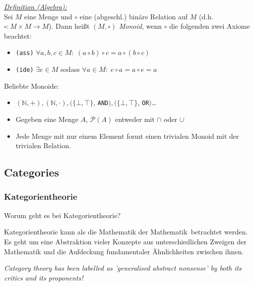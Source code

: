 \documentclass{beamer}
\begin{document}
\begin{frame}
\underline{\emph{Definition (Algebra):}}\\ Sei $M$ eine Menge und $\circ$ eine (abgeschl.) binäre Relation auf $M$ (d.h. $\circ : M \times M \to M$). Dann heißt $(M, \circ)$ \emph{Monoid}, wenn $\circ$ die folgenden zwei Axiome beachtet:

\begin{itemize}
\pause \item \texttt{(ass)} $\forall a,b,c \in M:\; (a \circ b) \circ c = a \circ (b \circ c)$
\pause \item \texttt{(ide)} $\exists e \in M$ sodass $\forall a \in M:\; e \circ a = a \circ e = a$
\end{itemize}
\pause\bigskip

Beliebte Monoide:
\begin{itemize}
\pause \item $(\mathbb{N}, +), (\mathbb{N}, \cdot), (\{\bot, \top\}$, \texttt{AND}$), (\{\bot, \top\}$, \texttt{OR}$)$\dots
\pause \item Gegeben eine Menge $A$, $\mathcal{P}(A)$ entweder mit $\cap$ oder $\cup$
\pause \item Jede Menge mit nur einem Element formt einen trivialen Monoid mit der trivialen Relation.
\end{itemize}

\end{frame}

\subsection*{Categories}

\begin{frame}
\frametitle{Kategorientheorie}

Worum geht es bei Kategorientheorie?
\pause\bigskip

Kategorientheorie kann als die \glqq Mathematik der Mathematik\grqq\ betrachtet werden. Es geht um eine
Abstraktion vieler Konzepte aus unterschiedlichen Zweigen der Mathematik und die Aufdeckung fundamentaler
Ähnlichkeiten zwischen ihnen.
\pause\bigskip

\textit{\glqq Category theory has been labelled as 'generalised abstract nonsense' by both its critics and 
its proponents!\grqq}
\end{frame}

\end{document}
